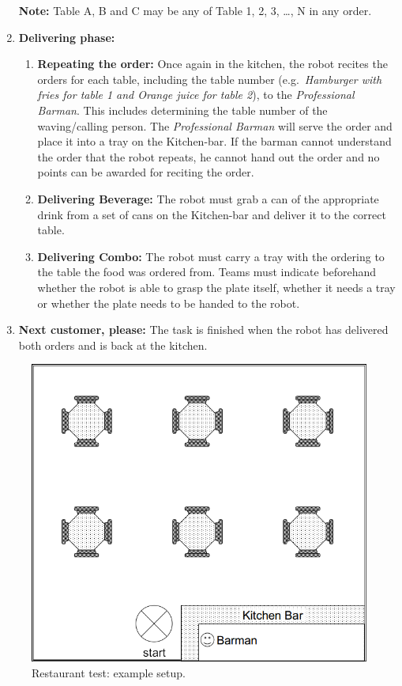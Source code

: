 \begin{enumerate}
	\textbf{Note:} Table A, B and C may be any of Table 1, 2, 3, \dots, N in any order.

	\item \textbf{Delivering phase:}
	\begin{enumerate}
		\item \textbf{Repeating the order:} Once again in the kitchen, the robot recites the orders for each table, including the table number (e.g.~\textit{Hamburger with fries for table 1 and Orange juice for table 2}), to the \textit{Professional Barman}. This includes determining the table number of the waving/calling person. The \textit{Professional Barman} will serve the order and place it into a tray on the Kitchen-bar.
		  If the barman cannot understand the order that the robot repeats, he cannot hand out the order and no points can be awarded for reciting the order.

		\item \textbf{Delivering Beverage:} The robot must grab a can of the appropriate drink from a set of cans on the Kitchen-bar and deliver it to the correct table.

		\item \textbf{Delivering Combo:}  The robot must carry a tray with the ordering to the table the food was ordered from. Teams must indicate beforehand whether the robot is able to grasp the plate itself, whether it needs a tray or whether the plate needs to be handed to the robot.
	\end{enumerate}

	\item \textbf{Next customer, please:} The task is finished when the robot has delivered both orders and is back at the kitchen.
\end{enumerate}

\begin{figure}[tbp]
	\centering
	\includegraphics[width=0.5\columnwidth]{images/restaurant.png}
	\caption{Restaurant test: example setup.}
	\label{fig:restaurant}
\end{figure}

